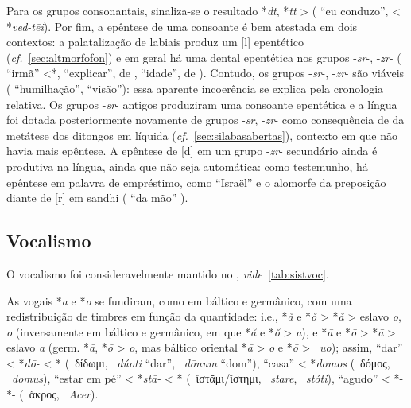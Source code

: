 Para os grupos consonantais, sinaliza-se o resultado *\emph{dt}, *\emph{tt} >
 ( ``eu conduzo'',  
< *\emph{ved-tēi}).
Por fim, a epêntese de uma consoante é bem atestada em dois contextos: a
palatalização de labiais produz um [l] epentético
(\emph{cf.}~\ref{sec:altmorfofon}) e em geral há uma dental epentética nos
grupos -\emph{sr}-, -\emph{zr}- ( ``irmã''
<*,  ``explicar'', de
,  ``idade'', de
).
Contudo, os grupos -\emph{sr}-, -\emph{zr}- são viáveis
( ``humilhação'',  ``visão''): essa
aparente incoerência se explica pela cronologia relativa.
Os grupos -\emph{sr}- antigos produziram uma consoante epentética e a língua foi
dotada posteriormente novamente de grupos -\emph{sr}, -\emph{zr}- como
consequência de da metátese dos ditongos em líquida (\emph{cf.}~\ref{sec:silabasabertas}),
contexto em que não havia mais epêntese. A epêntese de [d] em um grupo -\emph{zr}-
secundário ainda é produtiva na língua, ainda que não seja automática: como
testemunho, há epêntese em palavra de empréstimo, como
 ``Israël'' e o alomorfe  da
preposição  diante de [r] em sandhi ( ``da mão''
).


\subsection{Vocalismo}

O vocalismo foi consideravelmente mantido no , \emph{vide}~\autoref{tab:sistvoc}.



As vogais *\emph{a} e *\emph{o} se fundiram, como em báltico e germânico, com
uma redistribuição de timbres em função da quantidade: i.e., *\emph{ă} e
*\emph{ŏ} >  *\emph{ă} > eslavo \emph{o},  \emph{o}
(inversamente em báltico e germânico, em que *\emph{ă} e *\emph{ŏ} > \emph{a}),
e *\emph{ā} e *\emph{ō} >  *\emph{ā} > eslavo \emph{a} (germ.
*\emph{ā}, *\emph{ō} > \emph{o}, mas báltico oriental *\emph{ā} > \emph{o} e
*\emph{ō} > ~\emph{uo}); assim, 
``dar'' < *\emph{dō-} < * (~δίδωμι,
~\emph{dúoti} ``dar'', ~\emph{dōnum}
``dom''),  ``casa'' < *\emph{domos}
(~δόμος, ~\emph{domus}),
 ``estar em pé'' < *\emph{stā-} < *
(~ἵστᾱμι\slash{}ἵστημι, ~\emph{stare},
~\emph{stóti}),  ``agudo'' <
*- *- (~ἄκρος,
~\emph{Acer}).

